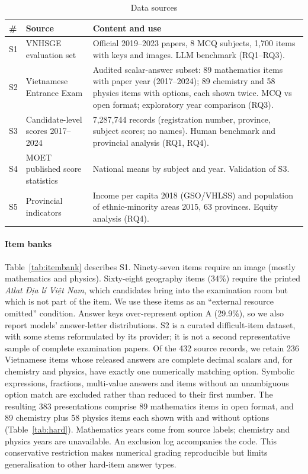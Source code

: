 \documentclass[preprint,12pt,authoryear,nonatbib]{elsarticle}
\begin{document}
\begin{table}[H]\centering\small
\caption{Data sources}\label{tab:sources}
\begin{tabularx}{\textwidth}{@{}l>{\raggedright}p{3.8cm}X@{}}
\toprule
\# & Source & Content and use\\
\midrule
S1 & VNHSGE evaluation set \citep{dao2023vnhsge} & Official 2019--2023 papers, 8 MCQ subjects, 1,700 items with keys and images. LLM benchmark (RQ1--RQ3).\\
 S2 & Vietnamese Entrance Exam \citep{iithought2025} & Audited scalar-answer subset: 89 mathematics items with paper year (2017--2024); 89 chemistry and 58 physics items with options, each shown twice. MCQ vs open format; exploratory year comparison (RQ3).\\
S3 & Candidate-level scores 2017--2024 \citep{thptqgscores} & 7,287,744 records (registration number, province, subject scores; no names). Human benchmark and provincial analysis (RQ1, RQ4).\\
S4 & MOET published score statistics \citep{moet2023scores} & National means by subject and year. Validation of S3.\\
S5 & Provincial indicators \citep{odm2018income,odm2015ethnic} & Income per capita 2018 (GSO/VHLSS) and population of ethnic-minority areas 2015, 63 provinces. Equity analysis (RQ4).\\
\bottomrule
\end{tabularx}
\end{table}

\paragraph{Item banks} Table~\ref{tab:itembank} describes S1. Ninety-seven items require an image (mostly mathematics and physics). Sixty-eight geography items (34\%) require the printed \emph{Atlat Địa lí Việt Nam}, which candidates bring into the examination room but which is not part of the item. We use these items as an ``external resource omitted'' condition. Answer keys over-represent option A (29.9\%), so we also report models' answer-letter distributions. S2 is a curated difficult-item dataset, with some stems reformulated by its provider; it is not a second representative sample of complete examination papers. Of the 432 source records, we retain 236 Vietnamese items whose released answers are complete decimal scalars and, for chemistry and physics, have exactly one numerically matching option. Symbolic expressions, fractions, multi-value answers and items without an unambiguous option match are excluded rather than reduced to their first number. The resulting 383 presentations comprise 89 mathematics items in open format, and 89 chemistry plus 58 physics items each shown with and without options (Table~\ref{tab:hard}). Mathematics years come from source labels; chemistry and physics years are unavailable. An exclusion log accompanies the code. This conservative restriction makes numerical grading reproducible but limits generalisation to other hard-item answer types.
\end{document}
